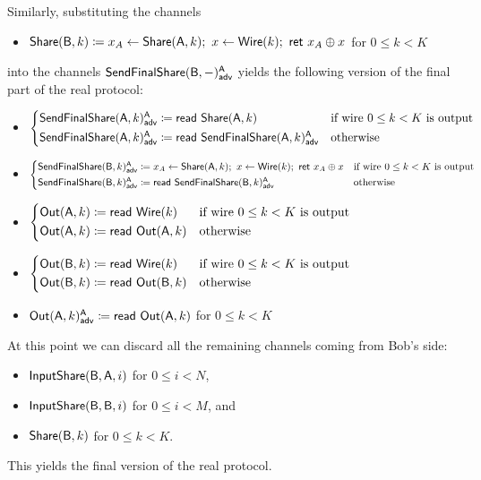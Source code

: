 \noindent Similarly, substituting the channels
\begin{itemize}
\item $\mathsf{Share}(\mathsf{B},k) \coloneqq x_A \leftarrow \mathsf{Share}(\mathsf{A},k); \ x \leftarrow \mathsf{Wire}(k); \ \mathsf{ret} \ x_A \oplus x$ for $0 \leq k < K$
\end{itemize}
into the channels $\mathsf{SendFinalShare}(\mathsf{B},-)^{\mathsf{A}}_{\mathsf{adv}}$ yields the following version of the final part of the real protocol:

\begin{itemize}
\item {\color{blue} $\begin{cases*} \LeakSendFinalShare(\A,k)^\A_\adv \coloneqq \read{\Share(\A,k)} & \text{if wire $0 \leq k < K$ is output} \\ \LeakSendFinalShare(\A,k)^\A_\adv \coloneqq \read{\LeakSendFinalShare(\A,k)^\A_\adv} & \text{otherwise} \end{cases*}$}
\item {\color{blue} $\begin{cases*} \LeakSendFinalShare(\B,k)^\A_\adv \coloneqq x_A \leftarrow \Share(\A,k); \ x \leftarrow \Wire(k); \ \ret{x_A \oplus x} & \text{if wire $0 \leq k < K$ is output} \\ \LeakSendFinalShare(\B,k)^\A_\adv \coloneqq \read{\LeakSendFinalShare(\B,k)^\A_\adv} & \text{otherwise} \end{cases*}$}
\item $\begin{cases*} \Out(\A,k) \coloneqq \read{\Wire(k)} & \text{if wire $0 \leq k < K$ is output} \\ \Out(\A,k) \coloneqq \read{\Out(\A,k)} & \text{otherwise} \end{cases*}$
\item $\begin{cases*} \Out(\B,k) \coloneqq \read{\Wire(k)} & \text{if wire $0 \leq k < K$ is output} \\ \Out(\B,k) \coloneqq \read{\Out(\B,k)} & \text{otherwise} \end{cases*}$
\item {\color{blue} $\mathsf{Out}(\mathsf{A},k)^{\mathsf{A}}_{\mathsf{adv}} \coloneqq \mathsf{read} \ \mathsf{Out}(\mathsf{A},k)$ for $0 \leq k < K$}
\end{itemize}

\noindent At this point we can discard all the remaining channels coming from Bob's side:
\begin{itemize}
\item $\mathsf{InputShare}(\mathsf{B},\mathsf{A},i)$ for $0 \leq i < N$,
\item $\mathsf{InputShare}(\mathsf{B},\mathsf{B},i)$ for $0 \leq i < M$, and
\item $\mathsf{Share}(\mathsf{B},k)$ for $0 \leq k < K$.
\end{itemize}
This yields the final version of the real protocol.

